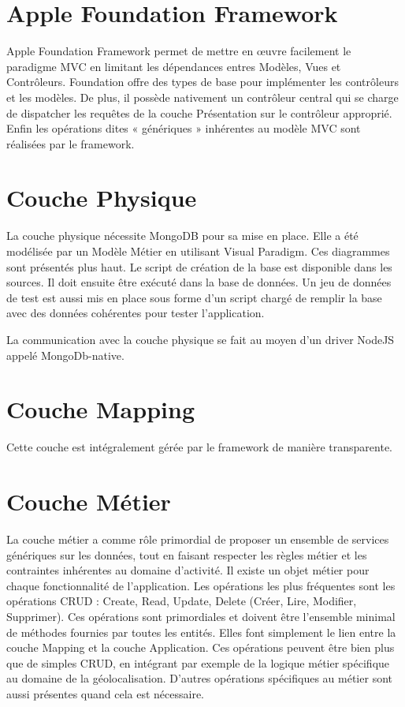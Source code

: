 \documentclass[a4paper,12pt]{report}
\begin{document}
\begin{onehalfspace}
\section{Apple Foundation Framework}
  Apple Foundation Framework permet de mettre en œuvre facilement le paradigme MVC en limitant les dépendances entres Modèles, Vues et Contrôleurs. Foundation offre des types de base pour implémenter les contrôleurs et les modèles. De plus, il possède nativement un contrôleur central qui se charge de dispatcher les requêtes de la couche Présentation sur le contrôleur approprié. Enfin les opérations dites « génériques » inhérentes au modèle MVC sont réalisées par le framework.

\section{Couche Physique}
  La couche physique nécessite MongoDB pour sa mise en place. Elle a été modélisée par un Modèle Métier en utilisant Visual Paradigm. Ces diagrammes sont présentés plus haut. Le script de création de la base est disponible dans les sources. Il doit ensuite être exécuté dans la base de données. Un jeu de données de test est aussi mis en place sous forme d’un script chargé de remplir la base avec des données cohérentes pour tester l’application.
  
  La communication avec la couche physique se fait au moyen d’un driver NodeJS appelé MongoDb-native.

\section{Couche Mapping}
Cette couche est intégralement gérée par le framework de manière transparente.

\section{Couche Métier}
  La couche métier a comme rôle primordial de proposer un ensemble de services génériques sur les données, tout en faisant respecter les règles métier et les contraintes inhérentes au domaine d’activité.
  Il existe un objet métier pour chaque fonctionnalité de l’application. Les opérations les plus fréquentes sont les opérations CRUD : Create, Read, Update, Delete (Créer, Lire, Modifier, Supprimer). Ces opérations sont primordiales et doivent être l’ensemble minimal de méthodes fournies par toutes les entités. Elles font simplement le lien entre la couche Mapping et la couche Application.
  Ces opérations peuvent être bien plus que de simples CRUD, en intégrant par exemple de la logique métier spécifique au domaine de la géolocalisation. D’autres opérations spécifiques au métier sont aussi présentes quand cela est nécessaire.


\end{onehalfspace}
\end{document}
